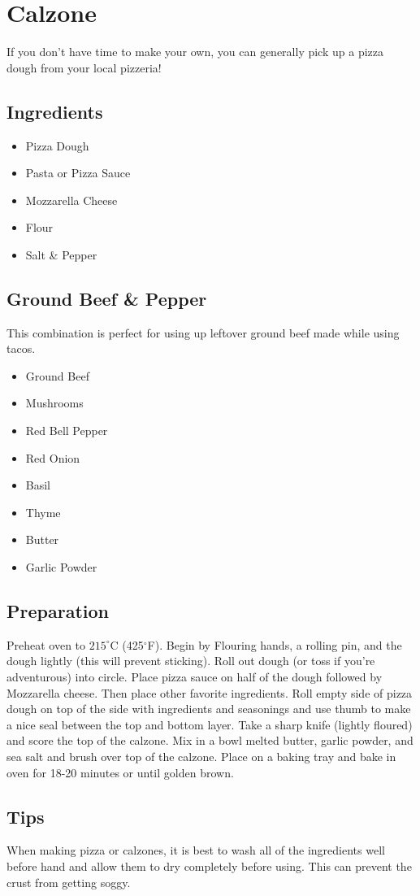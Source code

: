 \thispagestyle{fancy}
\section{Calzone}
\AddToShipoutPicture*{\Calzone}
If you don't have time to make your own, you can generally pick up a pizza dough from your local pizzeria!
\subsection*{Ingredients}
\begin{multicols}{3}
	\begin{itemize}
		\item Pizza Dough
		\item Pasta or Pizza Sauce
		\item Mozzarella Cheese
		\item Flour
		\item Salt \& Pepper
	\end{itemize}
\end{multicols}

\subsection*{Ground Beef \& Pepper}
This combination is perfect for using up leftover ground beef made while using tacos.
\begin{multicols}{3}
	\begin{itemize}
		\item Ground Beef
		\item Mushrooms
		\item Red Bell Pepper
		\item Red Onion
		\item Basil
		\item Thyme
		\item Butter
		\item Garlic Powder
	\end{itemize}
\end{multicols}

\subsection*{Preparation}

Preheat oven to $215^\circ$C (425$^\circ$F). Begin by Flouring hands, a rolling pin, and the dough lightly (this will prevent sticking). Roll out dough (or toss if you're adventurous) into circle. Place pizza sauce on half of the dough followed by Mozzarella cheese. Then place other favorite ingredients. Roll empty side of pizza dough on top of the side with ingredients and seasonings and use thumb to make a nice seal between the top and bottom layer. Take a sharp knife (lightly floured) and score the top of the calzone. Mix in a bowl melted butter, garlic powder, and sea salt and brush over top of the calzone. Place on a baking tray and bake in oven for 18-20 minutes or until golden brown.

\subsection*{Tips}

When making pizza or calzones, it is best to wash all of the ingredients well before hand and allow them to dry completely before using. This can prevent the crust from getting soggy.